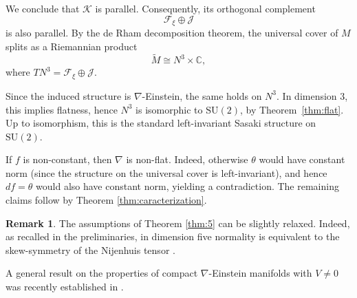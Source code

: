 \documentclass{article}
\makeatletter
\renewenvironment{proof}[1][\proofname]{%
  \par\pushQED{\qed}%
  \normalfont\topsep6\p@\@plus6\p@\relax
  \trivlist
  \item[\hskip\labelsep
        \textbf{\textup{#1}}\@addpunct{.}]\ignorespaces
}{%
  \popQED\endtrivlist\@endpefalse
}
\theoremstyle{definition}
\newtheorem{rmk}[thm]{Remark}
\numberwithin{equation}{section}
\makeatother
\begin{document}
\begin{proof}
We conclude that $\mathcal{K}$ is parallel. Consequently, its orthogonal complement
\[
\mathcal{F}_\xi \oplus \mathcal{J}
\]
is also parallel. By the de Rham decomposition theorem, the universal cover of $M$ splits as a Riemannian product
\[
\widetilde{M} \cong N^3 \times \mathbb{C},
\]
where $TN^3 = \mathcal{F}_\xi \oplus \mathcal{J}$.

Since the induced structure is $\nabla$-Einstein, the same holds on $N^3$. In dimension $3$, this implies flatness, hence $N^3$ is isomorphic to $\mathrm{SU}(2)$, by Theorem~\ref{thm:flat}. Up to isomorphism, this is the standard left-invariant Sasaki structure on $\mathrm{SU}(2)$.
\noindent

\medskip 
\noindent

If $f$ is non-constant, then $\nabla$ is non-flat. Indeed, otherwise $\theta$ would have constant norm (since the structure on the universal cover is left-invariant), and hence $df = \theta$ would also have constant norm, yielding a contradiction. The remaining claims follow by Theorem \ref{thm:caracterization}.

\end{proof}

\begin{rmk}
The assumptions of Theorem \ref{thm:5} can be slightly relaxed. Indeed, as recalled in the preliminaries, in dimension five normality is equivalent to the skew-symmetry of the Nijenhuis tensor \cite{CM}.
\end{rmk}
A general result on the properties of compact $\nabla$-Einstein manifolds with $V \neq 0$ was recently established in \cite[Theorem 5.6]{KS}.
\end{document}
